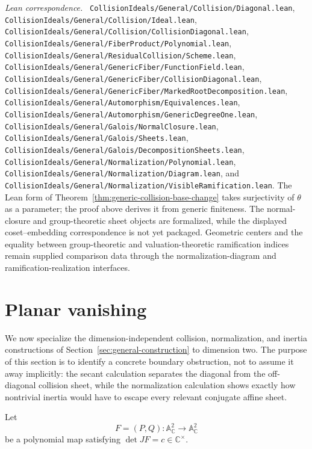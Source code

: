 \documentclass[11pt]{article}
\theoremstyle{remark}
\theoremstyle{definition}
\newcommand{\A}{\mathbb A}
\newcommand{\C}{\mathbb C}
\newcommand{\leanpath}[1]{\texttt{\nolinkurl{#1}}}
\newenvironment{leanfiles}
  {\par\medskip\begingroup\footnotesize\raggedright\noindent
   \textit{Lean correspondence.}\ }
  {\par\endgroup\medskip}
\begin{document}
\begin{leanfiles}
\leanpath{CollisionIdeals/General/Collision/Diagonal.lean},
\leanpath{CollisionIdeals/General/Collision/Ideal.lean},
\leanpath{CollisionIdeals/General/Collision/CollisionDiagonal.lean},
\leanpath{CollisionIdeals/General/FiberProduct/Polynomial.lean},
\leanpath{CollisionIdeals/General/ResidualCollision/Scheme.lean},
\leanpath{CollisionIdeals/General/GenericFiber/FunctionField.lean},
\leanpath{CollisionIdeals/General/GenericFiber/CollisionDiagonal.lean},
\leanpath{CollisionIdeals/General/GenericFiber/MarkedRootDecomposition.lean},
\leanpath{CollisionIdeals/General/Automorphism/Equivalences.lean},
\leanpath{CollisionIdeals/General/Automorphism/GenericDegreeOne.lean},
\leanpath{CollisionIdeals/General/Galois/NormalClosure.lean},
\leanpath{CollisionIdeals/General/Galois/Sheets.lean},
\leanpath{CollisionIdeals/General/Galois/DecompositionSheets.lean},
\leanpath{CollisionIdeals/General/Normalization/Polynomial.lean},
\leanpath{CollisionIdeals/General/Normalization/Diagram.lean}, and
\leanpath{CollisionIdeals/General/Normalization/VisibleRamification.lean}.
The Lean form of
Theorem~\ref{thm:generic-collision-base-change} takes surjectivity of
\(\theta\) as a parameter; the proof above derives it from generic
finiteness.  The normal-closure and group-theoretic sheet objects are
formalized, while the displayed coset--embedding correspondence is not yet
packaged.  Geometric centers and the equality between group-theoretic and
valuation-theoretic ramification indices remain supplied comparison data
through the normalization-diagram and ramification-realization interfaces.
\end{leanfiles}

\section{Planar vanishing}
\label{sec:planar-vanishing}

We now specialize the dimension-independent collision, normalization,
and inertia constructions of Section~\ref{sec:general-construction} to
dimension two.  The purpose of this section is to identify a concrete
boundary obstruction, not to assume it away implicitly: the secant
calculation separates the diagonal from the off-diagonal collision sheet,
while the normalization calculation shows exactly how nontrivial inertia
would have to escape every relevant conjugate affine sheet.

Let
\[
  F=(P,Q)\colon\A^2_{\C}\longrightarrow\A^2_{\C}
\]
be a polynomial map satisfying
\(\det JF=c\in\C^\times\).
\end{document}
